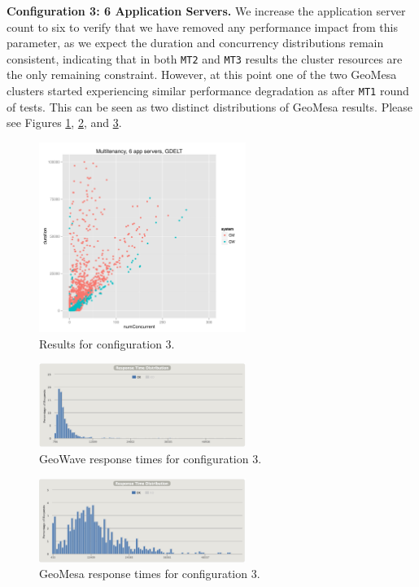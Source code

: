 {\bf Configuration 3: 6 Application Servers.}
We increase the application server count to six to verify that we have removed any performance impact from this parameter,
as we expect the duration and concurrency distributions remain consistent, indicating that in both \texttt{MT2} and \texttt{MT3} results the cluster resources are the only remaining constraint.
However, at this point one of the two GeoMesa clusters started experiencing similar performance degradation as after \texttt{MT1} round of tests.
This can be seen as two distinct distributions of GeoMesa results.
Please see Figures \ref{config3}, \ref{config3distrogw}, and \ref{config3distrogm}.

\begin{figure}[h!tb]
  \centering
  \includegraphics[width=0.60\textwidth]{../docs/img/multitenancy/graph_100k_mt3.png}
  \caption{Results for configuration 3.}
  \label{config3}
\end{figure}

\begin{figure}[h!tb]
  \centering
  \includegraphics[width=0.60\textwidth]{images/mt3-2-gw.png}
  \caption{GeoWave response times for configuration 3.}
  \label{config3distrogw}
\end{figure}

\begin{figure}[h!tb]
  \centering
  \includegraphics[width=0.60\textwidth]{images/mt3-2-gm.png}
  \caption{GeoMesa response times for configuration 3.}
  \label{config3distrogm}
\end{figure}

